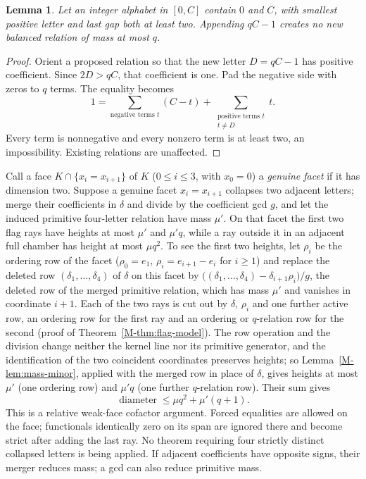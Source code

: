 \documentclass[11pt,reqno]{amsart}
\theoremstyle{plain}
\newtheorem{lemma}[theorem]{Lemma}
\theoremstyle{definition}
\theoremstyle{plain}
\theoremstyle{plain}
\theoremstyle{plain}
\theoremstyle{plain}
\theoremstyle{plain}
\theoremstyle{plain}
\theoremstyle{definition}
\theoremstyle{definition}
\theoremstyle{definition}
\theoremstyle{plain}
\begin{document}
\begin{lemma}\label{M-lem:model-append-minus-one}
Let an integer alphabet in $[0,C]$ contain $0$ and $C$, with smallest
positive letter and last gap both at least two. Appending $qC-1$
creates no new balanced relation of mass at most $q$.
\end{lemma}
\begin{proof}
Orient a proposed relation so that the new letter $D=qC-1$ has positive
coefficient. Since $2D>qC$, that coefficient is one. Pad the negative
side with zeros to $q$ terms. The equality becomes
\[
 1=\sum_{\text{negative terms }t}(C-t)
    +\sum_{\substack{\text{positive terms }t\\t\ne D}}t.
\]
Every term is nonnegative and every nonzero term is at least two, an
impossibility. Existing relations are unaffected.
\end{proof}

Call a face $K\cap\{x_i=x_{i+1}\}$ of $K$ ($0\le i\le3$, with $x_0=0$) a
\emph{genuine facet} if it has dimension two. Suppose a genuine facet
$x_i=x_{i+1}$ collapses two adjacent letters; merge their coefficients in
$\delta$ and divide by the coefficient gcd $g$, and let the induced
primitive four-letter relation have mass $\mu'$. On that facet the first two
flag rays have heights at most $\mu'$ and $\mu'q$, while a ray outside it in
an adjacent full chamber has height at most $\mu q^2$. To see the first two
heights, let $\rho_i$ be the ordering row of the facet ($\rho_0=e_1$,
$\rho_i=e_{i+1}-e_i$ for $i\ge1$) and replace the deleted row
$(\delta_1,\ldots,\delta_4)$ of $\delta$ on this facet by
$\bigl((\delta_1,\ldots,\delta_4)-\delta_{i+1}\rho_i\bigr)/g$, the deleted
row of the merged primitive relation, which has mass $\mu'$ and vanishes in
coordinate $i+1$. Each of the two rays is cut out by $\delta$, $\rho_i$ and
one further active row, an ordering row for the first ray and an ordering or
$q$-relation row for the second (proof of Theorem~\ref{M-thm:flag-model}).
The row operation and the division change neither the kernel line nor its
primitive generator, and the identification of the two coincident
coordinates preserves heights; so Lemma~\ref{M-lem:mass-minor}, applied with
the merged row in place of $\delta$, gives heights at most $\mu'$ (one
ordering row) and $\mu'q$ (one further $q$-relation row). Their sum gives
\begin{equation}\label{M-eq:model-mass-drop}
 \operatorname{diameter}\le\mu q^2+\mu'(q+1).
\end{equation}
This is a relative weak-face cofactor argument. Forced equalities are
allowed on the face; functionals identically zero on its span are ignored
there and become strict after adding the last ray. No theorem requiring
four strictly distinct collapsed letters is being applied. If adjacent
coefficients have opposite signs, their merger reduces mass; a gcd can
also reduce primitive mass.
\end{document}
